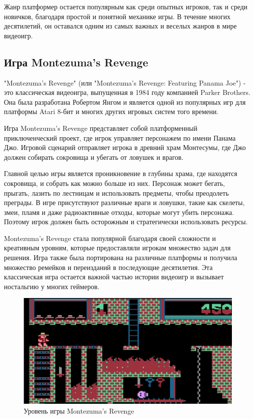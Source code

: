 Жанр платформер остается популярным как среди опытных игроков, так и среди новичков, благодаря простой и понятной механике игры. В течение многих десятилетий, он оставался одним из самых важных и веселых жанров в мире видеоигр.
\subsection{Игра Montezuma's Revenge }
"Montezuma's Revenge" (или "Montezuma's Revenge: Featuring Panama Joe") - это классическая видеоигра, выпущенная в 1984 году компанией Parker Brothers. Она была разработана Робертом Янгом и является одной из популярных игр для платформы Atari 8-бит и многих других игровых систем того времени.

Игра Montezuma's Revenge представляет собой платформенный приключенческий проект, где игрок управляет персонажем по имени Панама Джо. Игровой сценарий отправляет игрока в древний храм Монтесумы, где Джо должен собирать сокровища и убегать от ловушек и врагов.

Главной целью игры является проникновение в глубины храма, где находятся сокровища, и собрать как можно больше из них. Персонаж может бегать, прыгать, лазить по лестницам и использовать предметы, чтобы преодолеть преграды. В игре присутствуют различные враги и ловушки, такие как скелеты, змеи, пламя и даже радиоактивные отходы, которые могут убить персонажа. Поэтому игрок должен быть осторожным и стратегически использовать ресурсы.

Montezuma's Revenge стала популярной благодаря своей сложности и креативным уровням, которые предоставляли игрокам множество задач для решения. Игра также была портирована на различные платформы и получила множество ремейков и переизданий в последующие десятилетия. Эта классическая игра остается важной частью истории видеоигр и вызывает ностальгию у многих геймеров.

\begin{figure}[H]
	\centering
	\includegraphics[width=1\linewidth]{images/monrev}
	\caption{Уровень игры Montezuma's Revenge}
	\label{fig:monrev}
\end{figure}



